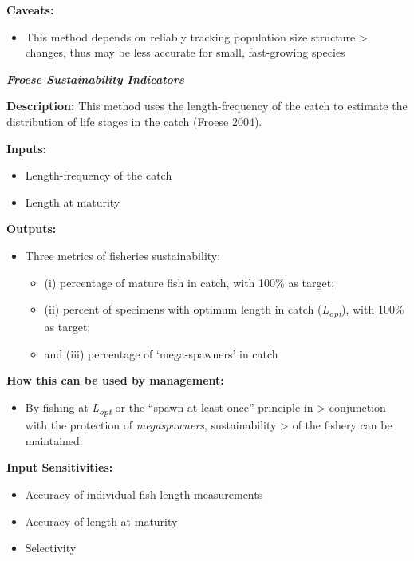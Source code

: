 \documentclass[]{book}
\providecommand{\tightlist}{%
  \setlength{\itemsep}{0pt}\setlength{\parskip}{0pt}}
\begin{document}
\textbf{Caveats:}

\begin{itemize}
\tightlist
\item
  This method depends on reliably tracking population size structure
  \textgreater{} changes, thus may be less accurate for small,
  fast-growing species
\end{itemize}

\textbf{\emph{Froese Sustainability Indicators}}

\textbf{Description:} This method uses the length-frequency of the catch
to estimate the distribution of life stages in the catch (Froese 2004).

\textbf{Inputs: }

\begin{itemize}
\item
  Length-frequency of the catch
\item
  Length at maturity
\end{itemize}

\textbf{Outputs: }

\begin{itemize}
\item
  Three metrics of fisheries sustainability:

  \begin{itemize}
  \item
    (i) percentage of mature fish in catch, with 100\% as target;
  \item
    (ii) percent of specimens with optimum length in catch
    (\emph{L\textsubscript{opt}}), with 100\% as target;
  \item
    and (iii) percentage of `mega-spawners' in catch
  \end{itemize}
\end{itemize}

\textbf{How this can be used by management:}

\begin{itemize}
\tightlist
\item
  By fishing at \emph{L\textsubscript{opt}} or the
  ``spawn-at-least-once'' principle in \textgreater{} conjunction with
  the protection of \emph{megaspawners}, sustainability \textgreater{}
  of the fishery can be maintained.
\end{itemize}

\textbf{Input Sensitivities:}

\begin{itemize}
\item
  Accuracy of individual fish length measurements
\item
  Accuracy of length at maturity
\item
  Selectivity
\end{itemize}
\end{document}
